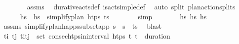 \begin{isabellebody}
\ \ \ \ \ \ \isamarkupfalse%
\ assms\ \isamarkupfalse%
\ durative{\isacharunderscore}{\kern0pt}acts{\isacharunderscore}{\kern0pt}def\ is{\isacharunderscore}{\kern0pt}act{\isacharunderscore}{\kern0pt}simple{\isacharunderscore}{\kern0pt}def\ \isamarkupfalse%
\ {\isacharparenleft}{\kern0pt}auto\ split{\isacharcolon}{\kern0pt}\ plan{\isacharunderscore}{\kern0pt}action{\isachardot}{\kern0pt}splits{\isacharparenright}{\kern0pt}\isanewline
\ \ \ \ \isamarkupfalse%
\ hs{\isacharprime}{\kern0pt}\ \ {\isachardoublequoteopen}hs{\isacharprime}{\kern0pt}\ {\isacharequal}{\kern0pt}\ simplify{\isacharunderscore}{\kern0pt}plan\ htps\ {\isacharparenleft}{\kern0pt}{\isacharparenleft}{\kern0pt}t\isactrlsub {\isasympi}{\isacharcomma}{\kern0pt}{\isasympi}{\isacharparenright}{\kern0pt}{\isacharhash}{\kern0pt}{\isasympi}s\isanewline
\ \ \ \ \ \ \isamarkupfalse%
\ simp\isanewline
\ \ \ \ \isamarkupfalse%
\ \isamarkupfalse%
\ {\isachardoublequoteopen}hs{\isacharprime}{\kern0pt}\ {\isasymsubseteq}\isactrlsub h\isactrlsub s\ hs{\isachardoublequoteclose}\isanewline
\ \ \ \ \ \ \isamarkupfalse%
\ assms\ simplify{\isacharunderscore}{\kern0pt}plan{\isacharunderscore}{\kern0pt}happs{\isacharunderscore}{\kern0pt}subset{\isacharunderscore}{\kern0pt}app\ {\isacartoucheopen}{\isasympi}s\ {\isacharequal}{\kern0pt}\ {\isasympi}s\ {\isacharat}{\kern0pt}\ {\isacharparenleft}{\kern0pt}{\isacharparenleft}{\kern0pt}t\isactrlsub {\isasympi}{\isacharcomma}{\kern0pt}{\isasympi}{\isacharparenright}{\kern0pt}{\isacharhash}{\kern0pt}{\isasympi}s\ \isamarkupfalse%
\ blast\isanewline
\ \ \ \ \isamarkupfalse%
\ {\isachardoublequoteopen}{\isasymforall}t\isactrlsub i\ t\isactrlsub j{\isachardot}{\kern0pt}\ {\isacharparenleft}{\kern0pt}t\isactrlsub i{\isacharcomma}{\kern0pt}t\isactrlsub j{\isacharparenright}{\kern0pt}\ {\isasymin}\ set\ {\isacharparenleft}{\kern0pt}consec{\isacharunderscore}{\kern0pt}htps{\isacharunderscore}{\kern0pt}in{\isacharunderscore}{\kern0pt}interval\ htps\ t\isactrlsub {\isasympi}\ {\isacharparenleft}{\kern0pt}t\isactrlsub {\isasympi}\ {\isacharplus}{\kern0pt}\ {\isacharparenleft}{\kern0pt}duration\ {\isasympi}{\isacharparenright}{\kern0pt}{\isacharparenright}{\kern0pt}{\isacharparenright}{\kern0pt}\ \isanewline

\end{isabellebody}
